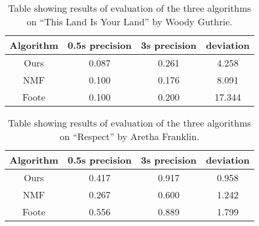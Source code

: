 \begin{table}
\begin{center}
\begin{tabular}{| c | c | c | c |} \hline 
Algorithm  &   0.5s precision   	&  3s precision 	&   deviation   	\\ \hline \hline
Ours			& 	0.087				&  0.261				& 	4.258		\\ \hline
NMF			&  0.100				&  0.176				&	8.091		\\ \hline
Foote		&  0.100				&  0.200				& 	17.344		\\ \hline
\end{tabular}
\caption{Table showing results of evaluation of the three algorithms on ``This Land Is Your Land'' by Woody Guthrie.}
\label{table:evalLand}
\end{center}
\end{table}


\begin{table}
\begin{center}
\begin{tabular}{| c | c | c | c |} \hline 
Algorithm  &   0.5s precision   	&  3s precision 	&   deviation   	\\ \hline \hline
Ours			& 	0.417				&  0.917				& 	0.958		\\ \hline
NMF			&  0.267				&  0.600				&	1.242		\\ \hline
Foote		&  0.556				&  0.889				& 	1.799		\\ \hline
\end{tabular}
\caption{Table showing results of evaluation of the three algorithms on ``Respect'' by Aretha Franklin.}
\label{table:evalRespect}
\end{center}
\end{table}

